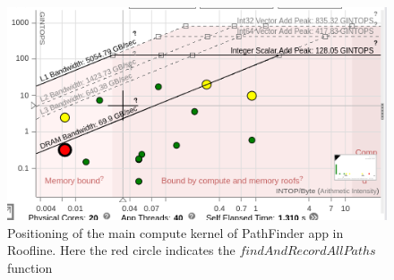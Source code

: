 \begin{figure}[t]%
\begin{center}
\includegraphics[width=1\linewidth]{MEMSYS22/figures/roofline/pathfinder.png}
\end{center}
  \vspace{-0.1in}
\caption{Positioning of the main compute kernel of PathFinder app in Roofline. Here the red circle indicates the $findAndRecordAllPaths$ function }
\label{fig:roof-pathfinder}
\vspace{-0.2in}
\end{figure}



%
%
%
%
%  
%
%
%


